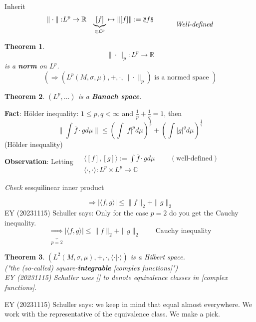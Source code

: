 \documentclass[10pt]{amsart}
\newtheorem{theorem}{Theorem}
\newcommand\dblwr{\wr\mkern-2mu\wr}
\newcommand{\seminorm}[1]{\mathopen{\dblwr}#1\mathclose{\dblwr}}
\begin{document}
\begin{multicols*}{2}
Inherit 
\[
\begin{aligned} 
	\| \cdot \| : & L^p \to \mathbb{R}
& \underbrace{[f]}_{ \in \mathcal{L}^p } \mapsto \| [f] \| := \seminorm{f}  
\end{aligned}	\quad \quad \quad \, \text{\emph{Well-defined}}
\]

\begin{theorem}	
	\[
	\| \cdot \|_p : L^p \to \mathbb{R}
	\] is a \textbf{norm} on $L^p$.
	\[
	(\Longrightarrow (L^p(M, \sigma, \mu), + , \cdot , \| \cdot \|_p ) \text{ is a normed space } )
	\]
\end{theorem}
\begin{theorem}
	$(L^p, \dots)$ is a \textbf{Banach space}.
\end{theorem}
\textbf{Fact}: H\"{o}lder inequality: $1 \leq p,q < \infty$ and $\frac{1}{p} + \frac{1}{q} = 1$, then
\[
\| \int \overline{f}\cdot g d\mu \| \leq  \left( \int |f|^p d\mu \right)^{\frac{1}{p}} + \left( \int |g|^q d\mu \right)^{\frac{1}{q}}
\]
(H\"{o}lder inequality) \\

\textbf{Observation}: Letting $\begin{aligned}
& 	\quad \\ 
& \langle [f], [g] \rangle := \int \overline{f}\cdot g d\mu \quad \quad \, (\text{well-defined}) \\
& \langle \cdot, \cdot \rangle : L^p \times L^p \to \mathbb{C} 
\end{aligned}$

\emph{Check} sesquilinear inner product

\[
\Longrightarrow |\langle f, g \rangle | \leq \| f \|_2 + \| g \|_2
\]
EY (20231115) Schuller says: Only for the case $p=2$ do you get the Cauchy inequality.
\[
\underbrace{\Longrightarrow}_{p = 2} |\langle f, g \rangle | \leq \| f \|_2 + \| g \|_2 \quad \quad \, \text{Cauchy inequality}
\]

\begin{theorem}
	$(L^2(M, \sigma, \mu), +, \cdot, \langle \cdot | \cdot \rangle)$ is a Hilbert space. \\

	("the (so-called) square-\textbf{integrable} [complex functions]") \\

EY (20231115) Schuller uses [] to denote equivalence classes in [complex functions].
\end{theorem}

EY (20231115) Schuller says: we keep in mind that equal almost everywhere. We work with the representative of the equivalence class. We make a pick.


\end{multicols*}
\end{document}
